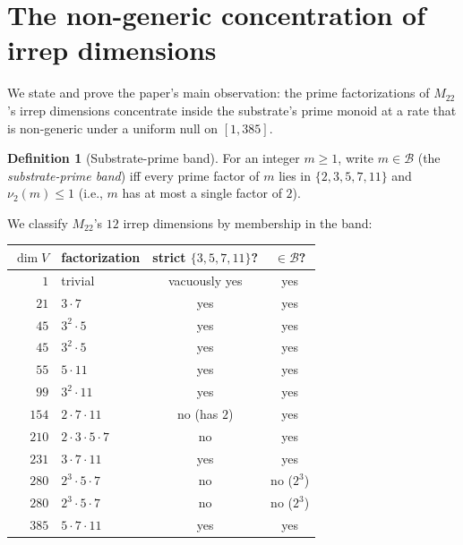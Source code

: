 \documentclass[11pt,reqno]{amsart}
\theoremstyle{plain}
\theoremstyle{definition}
\newtheorem{definition}[theorem]{Definition}
\theoremstyle{remark}
\newcommand{\Mtwentytwo}{M_{22}}
\begin{document}
\section{The non-generic concentration of irrep dimensions}
\label{sec:identities}

We state and prove the paper's main observation: the prime
factorizations of $\Mtwentytwo$'s irrep dimensions concentrate
inside the substrate's prime monoid at a rate that is non-generic
under a uniform null on $[1, 385]$.

\begin{definition}[Substrate-prime band]
\label{def:band}
For an integer $m \ge 1$, write $m \in \mathcal{B}$ (the
\emph{substrate-prime band}) iff every prime factor of $m$ lies in
$\{2, 3, 5, 7, 11\}$ and $\nu_{2}(m) \le 1$ (i.e., $m$ has at most a
single factor of $2$).
\end{definition}

We classify $\Mtwentytwo$'s $12$ irrep dimensions by membership in
the band:

\begin{center}
\begin{tabular}{r l c c}
\toprule
$\dim V$ & factorization & strict $\{3,5,7,11\}$? & $\in \mathcal{B}$? \\
\midrule
$1$    & trivial               & vacuously yes & yes \\
$21$   & $3 \cdot 7$           & yes & yes \\
$45$   & $3^{2} \cdot 5$       & yes & yes \\
$45$   & $3^{2} \cdot 5$       & yes & yes \\
$55$   & $5 \cdot 11$          & yes & yes \\
$99$   & $3^{2} \cdot 11$      & yes & yes \\
$154$  & $2 \cdot 7 \cdot 11$  & no (has $2$) & yes \\
$210$  & $2 \cdot 3 \cdot 5 \cdot 7$ & no & yes \\
$231$  & $3 \cdot 7 \cdot 11$  & yes & yes \\
$280$  & $2^{3} \cdot 5 \cdot 7$ & no & no ($2^{3}$) \\
$280$  & $2^{3} \cdot 5 \cdot 7$ & no & no ($2^{3}$) \\
$385$  & $5 \cdot 7 \cdot 11$  & yes & yes \\
\bottomrule
\end{tabular}
\end{center}
\end{document}
